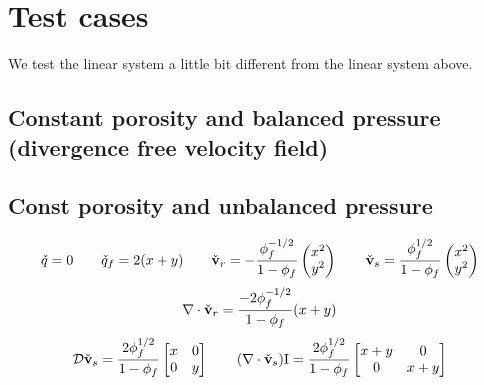 \newpage

\section{Test cases}
We test the linear system a little bit different from the linear system above. 
\subsection{Constant porosity and balanced pressure (divergence free velocity field)}


\subsection{Const porosity and unbalanced pressure}
\begin{equation}
\check{q} = 0 \quad \quad \check{q}_f = 2(x+y) \quad \quad 
\check{\bold{v}}_r = -\frac{\phi_f^{-1/2}}{1-\phi_f}\begin{pmatrix}x^2 \\ y^2 \end{pmatrix} 
\quad \quad \check{\bold{v}}_s = \frac{\phi_f^{1/2}}{1-\phi_f} \begin{pmatrix}x^2 \\ y^2 \end{pmatrix}
\end{equation}
\begin{equation}
\nabla \cdot \check{\bold{v}}_r = \frac{-2\phi_f^{-1/2}}{1-\phi_f}(x+y) 
\end{equation}
\begin{equation}
\mathcal{D}\check{\bold{v}}_s = \frac{2\phi_f^{1/2}}{1-\phi_f}\begin{bmatrix} x & 0 \\ 0 & y \end{bmatrix}
\quad \quad 
(\nabla \cdot \check{\bold{v}}_s) \bold{\text{I}} = \frac{2\phi_f^{1/2}}{1-\phi_f} \begin{bmatrix} x+y & 0 \\ 0 & x+y \end{bmatrix}
\end{equation}

